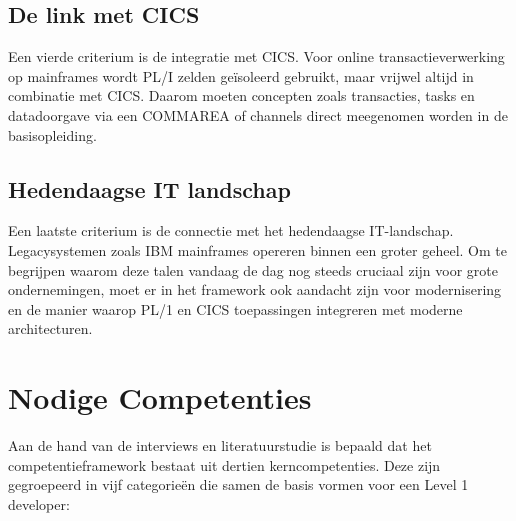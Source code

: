 \subsection{De link met CICS}
\label{sec:link-met-cics}

Een vierde criterium is de integratie met CICS.
Voor online transactieverwerking op mainframes wordt PL/I zelden geïsoleerd gebruikt, maar vrijwel altijd in combinatie met CICS.
Daarom moeten concepten zoals transacties, tasks en datadoorgave via een COMMAREA of channels direct meegenomen worden in de basisopleiding.

\subsection{Hedendaagse IT landschap}
\label{sec:Hedendaagse-IT-landschap}

Een laatste criterium is de connectie met het hedendaagse IT-landschap.
Legacysystemen zoals IBM mainframes opereren binnen een groter geheel.
Om te begrijpen waarom deze talen vandaag de dag nog steeds cruciaal zijn voor grote ondernemingen,
 moet er in het framework ook aandacht zijn voor modernisering en de manier waarop PL/1 en CICS toepassingen integreren met moderne architecturen.


\section{Nodige Competenties}%
\label{sec:Nodige-Competenties}

Aan de hand van de interviews en literatuurstudie is bepaald dat het competentieframework bestaat uit dertien kerncompetenties.
Deze zijn gegroepeerd in vijf categorieën die samen de basis vormen voor een Level 1 developer:

